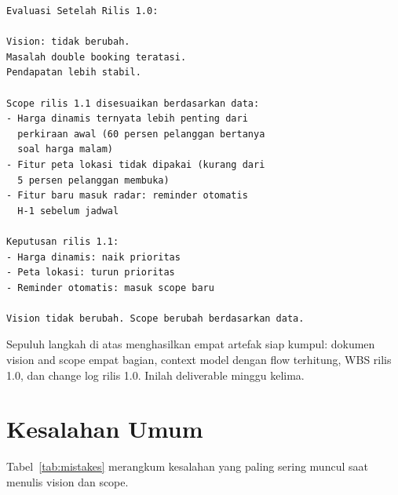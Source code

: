\documentclass[11pt,a4paper]{article}
\begin{document}
\begin{lstlisting}[style=out]
Evaluasi Setelah Rilis 1.0:

Vision: tidak berubah.
Masalah double booking teratasi.
Pendapatan lebih stabil.

Scope rilis 1.1 disesuaikan berdasarkan data:
- Harga dinamis ternyata lebih penting dari
  perkiraan awal (60 persen pelanggan bertanya
  soal harga malam)
- Fitur peta lokasi tidak dipakai (kurang dari
  5 persen pelanggan membuka)
- Fitur baru masuk radar: reminder otomatis
  H-1 sebelum jadwal

Keputusan rilis 1.1:
- Harga dinamis: naik prioritas
- Peta lokasi: turun prioritas
- Reminder otomatis: masuk scope baru

Vision tidak berubah. Scope berubah berdasarkan data.
\end{lstlisting}

Sepuluh langkah di atas menghasilkan empat artefak siap kumpul: dokumen vision and scope empat bagian, context model dengan flow terhitung, WBS rilis 1.0, dan change log rilis 1.0. Inilah deliverable minggu kelima.

\section{Kesalahan Umum}

Tabel~\ref{tab:mistakes} merangkum kesalahan yang paling sering muncul saat menulis vision dan scope.
\end{document}
